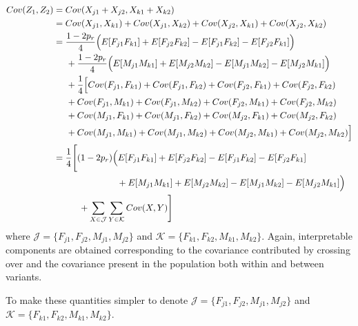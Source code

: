 \documentclass{article}
\begin{document}
\begin{align*}
  Cov(Z_1, Z_2) & = Cov(X_{j1} + X_{j2}, X_{k1} + X_{k2}) \\
                & = Cov(X_{j1}, X_{k1}) + Cov(X_{j1}, X_{k2}) + Cov(X_{j2}, X_{k1}) + Cov(X_{j2}, X_{k2}) \\
                & = \frac{1 - 2 p_r}{4} \Big ( E[F_{j1} F_{k1}] + E[F_{j2} F_{k2}] - E[F_{j1} F_{k2}] - E[F_{j2} F_{k1}] \Big ) \\
                & \hspace{0.5cm} + \frac{1 - 2 p_r}{4} \Big ( E[M_{j1} M_{k1}] + E[M_{j2} M_{k2}] - E[M_{j1} M_{k2}] - E[M_{j2} M_{k1}] \Big ) \\
                & \hspace{0.5cm} + \frac{1}{4} \Big [ Cov(F_{j1}, F_{k1}) + Cov(F_{j1}, F_{k2}) + Cov(F_{j2}, F_{k1}) + Cov(F_{j2}, F_{k2}) \\
                & \hspace{0.5cm} + Cov(F_{j1}, M_{k1}) + Cov(F_{j1}, M_{k2}) + Cov(F_{j2}, M_{k1}) + Cov(F_{j2}, M_{k2}) \\
                & \hspace{0.5cm} + Cov(M_{j1}, F_{k1}) + Cov(M_{j1}, F_{k2}) + Cov(M_{j2}, F_{k1}) + Cov(M_{j2}, F_{k2}) \\
                & \hspace{0.5cm} + Cov(M_{j1}, M_{k1}) + Cov(M_{j1}, M_{k2}) + Cov(M_{j2}, M_{k1}) + Cov(M_{j2}, M_{k2}) \Big ] \\
                & = \frac{1}{4} \Bigg [ (1 - 2p_r) \Big ( E[F_{j1} F_{k1}] + E[F_{j2} F_{k2}] - E[F_{j1} F_{k2}] - E[F_{j2} F_{k1}] \\
                & \hspace{2.5cm} + E[M_{j1} M_{k1}] + E[M_{j2} M_{k2}] - E[M_{j1} M_{k2}] - E[M_{j2} M_{k1}] \Big )  \\
                & \hspace{1cm} + \sum_{X \in \mathcal{J}} \sum_{Y \in \mathcal{K}} Cov(X,Y) \Bigg ]
\end{align*}
where $\mathcal{J} = \{F_{j1}, F_{j2}, M_{j1}, M_{j2}\}$ and $\mathcal{K} =  \{F_{k1}, F_{k2}, M_{k1}, M_{k2}\}$. Again, interpretable components are obtained corresponding to the covariance contributed by crossing over and the covariance present in the population both within and between variants.

To make these quantities simpler to denote $\mathcal{J} = \{F_{j1}, F_{j2}, M_{j1}, M_{j2}\}$ and $\mathcal{K} =  \{F_{k1}, F_{k2}, M_{k1}, M_{k2}\}$.


\renewcommand*{\bibname}{References} %

\end{document}
